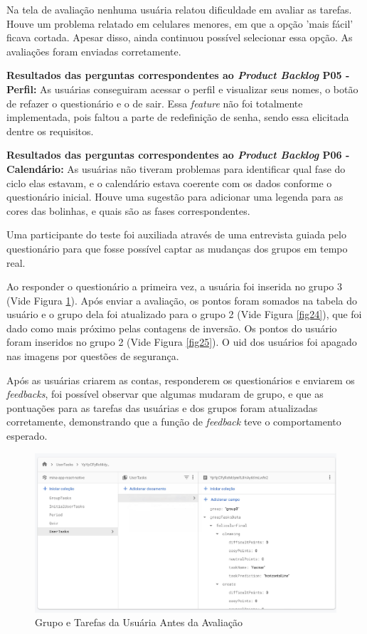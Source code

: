 Na tela de avaliação nenhuma usuária relatou dificuldade em avaliar as tarefas. Houve um problema relatado 
em celulares menores, em que a opção 'mais fácil' ficava cortada. Apesar disso, ainda continuou possível selecionar 
essa opção. As avaliações foram enviadas corretamente.

\textbf{Resultados das perguntas correspondentes ao \emph{Product Backlog} P05 - Perfil:} As usuárias conseguiram acessar o perfil 
e visualizar seus nomes, o botão de refazer o questionário e o de sair. Essa \emph{feature} não foi totalmente implementada, pois faltou a 
parte de redefinição de senha, sendo essa elicitada dentre os requisitos.

\textbf{Resultados das perguntas correspondentes ao \emph{Product Backlog} P06 - Calendário:} As usuárias não tiveram problemas 
para identificar qual fase do ciclo elas estavam, e o calendário estava coerente com os dados conforme o questionário inicial.
Houve uma sugestão para adicionar uma legenda para as cores das bolinhas, e quais são as fases correspondentes. 

Uma participante do teste foi auxiliada através de uma entrevista guiada pelo 
questionário para que fosse possível captar as mudanças dos grupos em tempo real. 

Ao responder o questionário a primeira vez, a usuária foi inserida no grupo 3 (Vide Figura \ref{fig23}). 
Após enviar a avaliação, os pontos foram somados 
na tabela do usuário e o grupo dela foi atualizado para o grupo 2 (Vide Figura \ref{fig24}), 
que foi dado como mais próximo pelas contagens de inversão. 
Os pontos do usuário foram inseridos no grupo 2 (Vide Figura \ref{fig25}). O uid dos usuários foi apagado nas 
imagens por questões de segurança.

Após as usuárias criarem as contas, responderem os questionários e enviarem os \emph{feedbacks}, foi possível observar que algumas 
mudaram de grupo, e que as pontuações para as tarefas das usuárias e dos grupos foram atualizadas corretamente, demonstrando que 
a função de \emph{feedback} teve o comportamento esperado. 

\begin{figure}[ht]
	\caption{Grupo e Tarefas da Usuária Antes da Avaliação}
	\begin{center}
	\includegraphics[keepaspectratio=true,scale=0.18]{figuras/db1.jpeg}
	\end{center}
    \label{fig23}
\end{figure}

